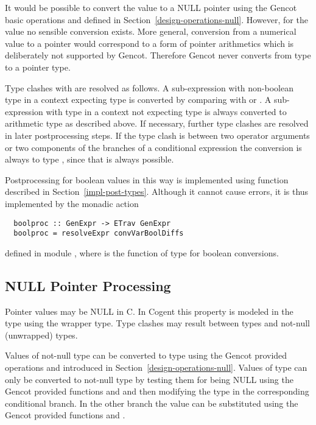 It would be possible to convert the value  to a NULL pointer using the Gencot basic operations  and
 defined in Section~\ref{design-operations-null}. However, for the value  no sensible conversion exists.
More general, conversion from a numerical value to a pointer would correspond to a form of pointer arithmetics which is
deliberately not supported by Gencot. Therefore Gencot never converts from type  to a pointer type.

Type clashes with  are resolved as follows. A sub-expression with non-boolean type in a context expecting type 
is converted by comparing with  or . A sub-expression with type  in a context not expecting
type  is always converted to arithmetic type  as described above. If necessary, further type clashes are resolved
in later postprocessing steps. If the type clash is between two operator arguments
or two components of the branches of a conditional expression the conversion is always to type , since that is always
possible.

Postprocessing for boolean values in this way is implemented using function  described in Section~\ref{impl-post-types}.
Although it cannot cause errors, it is thus implemented by the monadic action
\begin{verbatim}
  boolproc :: GenExpr -> ETrav GenExpr
  boolproc = resolveExpr convVarBoolDiffs
\end{verbatim}
defined in module , where  is the function of type 
for boolean conversions.

\subsection{NULL Pointer Processing}
\label{impl-post-null}

Pointer values may be NULL in C. In Cogent this property is modeled in the type using the  wrapper type. Type clashes
may result between  types and not-null (unwrapped) types.

Values of not-null type can be converted to  type using the Gencot provided operations  and 
introduced in Section~\ref{design-operations-null}. Values of  type can only be converted to not-null type by testing them
for being NULL using the Gencot provided functions  and  and then modifying the type in the corresponding
conditional branch. In the other branch the value can be substituted using the Gencot provided functions  and .

